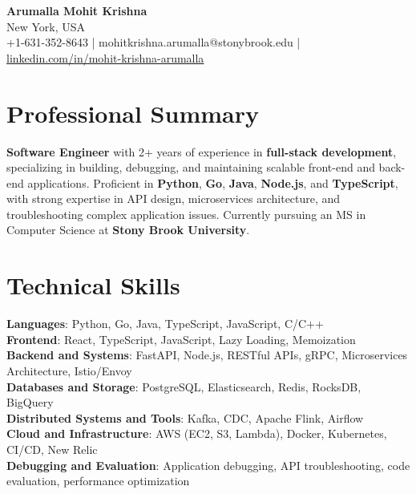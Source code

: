 \documentclass[letterpaper,11pt]{article}
\begin{document}
\begin{center}
  {\Large \textbf{Arumalla Mohit Krishna}} \\
  New York, USA \\
  +1-631-352-8643 \enspace | \enspace mohitkrishna.arumalla@stonybrook.edu \enspace | \enspace \href{https://www.linkedin.com/in/mohit-krishna-arumalla}{linkedin.com/in/mohit-krishna-arumalla}
\end{center}

\section{Professional Summary}
  \begin{itemize}[leftmargin=0.15in, label={}]
    \small{\item{
     \textbf{Software Engineer} with 2+ years of experience in \textbf{full-stack development}, specializing in building, debugging, and maintaining scalable front-end and back-end applications. Proficient in \textbf{Python}, \textbf{Go}, \textbf{Java}, \textbf{Node.js}, and \textbf{TypeScript}, with strong expertise in API design, microservices architecture, and troubleshooting complex application issues. Currently pursuing an MS in Computer Science at \textbf{Stony Brook University}.
    }}
  \end{itemize}
\vspace{-16pt}

\section{Technical Skills}
 \begin{itemize}[leftmargin=0.15in, label={}]
    \small{\item{
     \textbf{Languages}: Python, Go, Java, TypeScript, JavaScript, C/C++ \\
     \textbf{Frontend}: React, TypeScript, JavaScript, Lazy Loading, Memoization \\
     \textbf{Backend and Systems}: FastAPI, Node.js, RESTful APIs, gRPC, Microservices Architecture, Istio/Envoy \\
     \textbf{Databases and Storage}: PostgreSQL, Elasticsearch, Redis, RocksDB, BigQuery \\
     \textbf{Distributed Systems and Tools}: Kafka, CDC, Apache Flink, Airflow \\
     \textbf{Cloud and Infrastructure}: AWS (EC2, S3, Lambda), Docker, Kubernetes, CI/CD, New Relic \\
     \textbf{Debugging and Evaluation}: Application debugging, API troubleshooting, code evaluation, performance optimization
    }}
 \end{itemize}
\vspace{-16pt}
\end{document}
